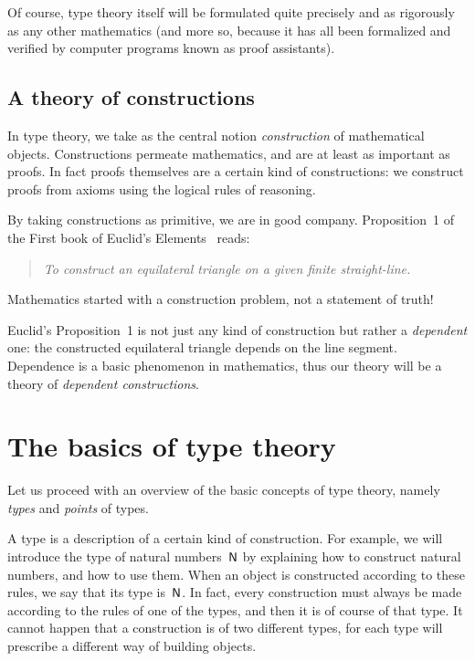 \documentclass{article}
\begin{document}
Of course, type theory itself will be formulated quite precisely and as
rigorously as any other mathematics (and more so, because it has all been
formalized and verified by computer programs known as proof assistants).


\subsection{A theory of constructions}

In type theory, we take as the central notion \emph{construction} of
mathematical objects. Constructions permeate mathematics, and are at least as
important as proofs. In fact proofs themselves are a certain kind of
constructions: we construct proofs from axioms using the logical rules of
reasoning.

By taking constructions as primitive, we are in good company. Proposition~1 of
the First book of Euclid's Elements~\cite{fitzpatrick09:_euclid_elemen} reads:
%
\begin{quote}
  \textit{To construct an equilateral triangle on a given finite straight-line.}
\end{quote}
%
Mathematics started with a construction problem, not a statement of truth!

Euclid's Proposition~1 is not just any kind of construction but rather a
\emph{dependent} one: the constructed equilateral triangle depends on the line
segment. Dependence is a basic phenomenon in mathematics, thus our theory will
be a theory of \emph{dependent constructions}.

\section{The basics of type theory}

Let us proceed with an overview of the basic concepts of type theory, namely
\emph{types} and \emph{points} of types.

A type is a description of a certain kind of construction. For example, we
will introduce the type of natural numbers~$\mathsf{N}$ by explaining how to
construct natural numbers, and how to use them. When an object is constructed
according to these rules, we say that its type is~$\mathsf{N}$. In fact, every
construction must always be made according to the rules of one of the types, and
then it is of course of that type. It cannot happen that a construction is of
two different types, for each type will prescribe a different way of building
objects.
\end{document}
